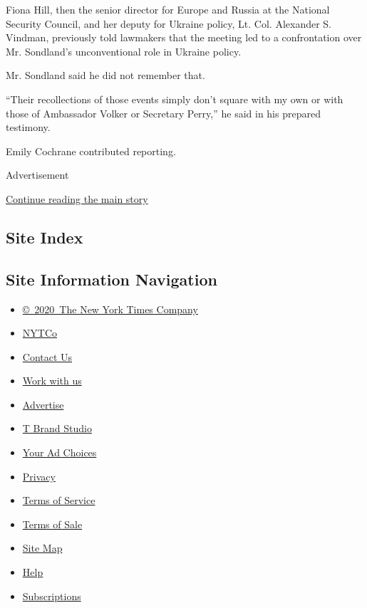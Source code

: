 Fiona Hill, then the senior director for Europe and Russia at the
National Security Council, and her deputy for Ukraine policy, Lt. Col.
Alexander S. Vindman, previously told lawmakers that the meeting led to
a confrontation over Mr. Sondland's unconventional role in Ukraine
policy.

Mr. Sondland said he did not remember that.

``Their recollections of those events simply don't square with my own or
with those of Ambassador Volker or Secretary Perry,'' he said in his
prepared testimony.

Emily Cochrane contributed reporting.

Advertisement

\protect\hyperlink{after-bottom}{Continue reading the main story}

\hypertarget{site-index}{%
\subsection{Site Index}\label{site-index}}

\hypertarget{site-information-navigation}{%
\subsection{Site Information
Navigation}\label{site-information-navigation}}

\begin{itemize}
\tightlist
\item
  \href{https://help.nytimes.com/hc/en-us/articles/115014792127-Copyright-notice}{©~2020~The
  New York Times Company}
\end{itemize}

\begin{itemize}
\tightlist
\item
  \href{https://www.nytco.com/}{NYTCo}
\item
  \href{https://help.nytimes.com/hc/en-us/articles/115015385887-Contact-Us}{Contact
  Us}
\item
  \href{https://www.nytco.com/careers/}{Work with us}
\item
  \href{https://nytmediakit.com/}{Advertise}
\item
  \href{http://www.tbrandstudio.com/}{T Brand Studio}
\item
  \href{https://www.nytimes.com/privacy/cookie-policy\#how-do-i-manage-trackers}{Your
  Ad Choices}
\item
  \href{https://www.nytimes.com/privacy}{Privacy}
\item
  \href{https://help.nytimes.com/hc/en-us/articles/115014893428-Terms-of-service}{Terms
  of Service}
\item
  \href{https://help.nytimes.com/hc/en-us/articles/115014893968-Terms-of-sale}{Terms
  of Sale}
\item
  \href{https://spiderbites.nytimes.com}{Site Map}
\item
  \href{https://help.nytimes.com/hc/en-us}{Help}
\item
  \href{https://www.nytimes.com/subscription?campaignId=37WXW}{Subscriptions}
\end{itemize}
